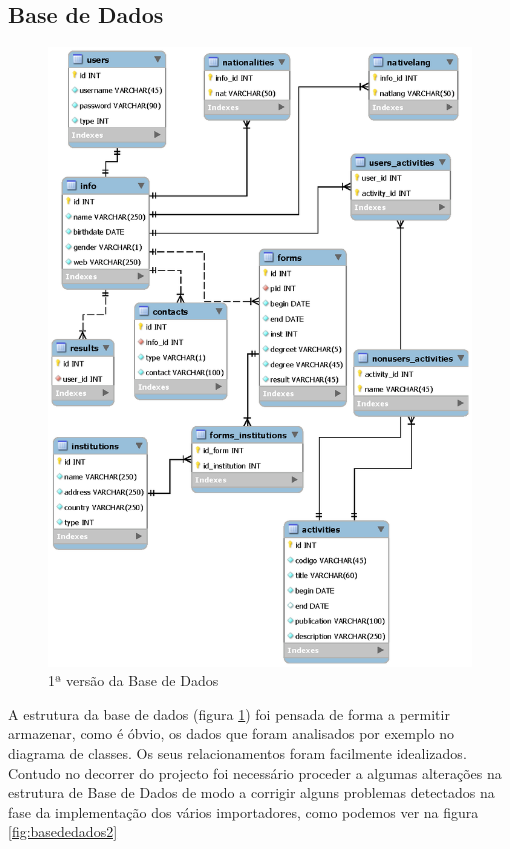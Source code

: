 \documentclass[a4paper,11pt,openright,openbib]{article}
\begin{document}
\subsection{Base de Dados}
\begin{figure}[!ht]
\centering
\includegraphics[scale=1]{bd.eps}
\caption{1ª versão da Base de Dados}
\label{fig:basededados}
\end{figure}
A estrutura da base de dados (figura \ref{fig:basededados}) foi pensada de forma a permitir armazenar, como é óbvio, os dados que foram analisados por exemplo no diagrama de classes. Os seus relacionamentos foram facilmente idealizados.\\
Contudo no decorrer do projecto foi necessário proceder a algumas alterações na estrutura de Base de Dados de modo a corrigir alguns problemas detectados na fase da implementação dos vários importadores, como podemos ver na figura \ref{fig:basededados2}
\end{document}
